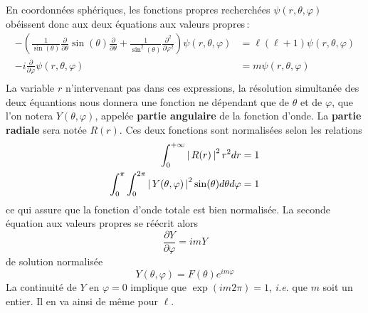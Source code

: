         \begin{demo}
            En coordonnées sphériques, les fonctions propres recherchées $\psi(r,\theta,\varphi)$ obéissent donc aux deux équations aux valeurs propres :
        \begin{align*}
            - \left(\frac{1}{\sin(\theta)}\frac{\partial }{\partial \theta} \sin(\theta) \frac{\partial }{\partial \theta}  + \frac{1}{\sin^2(\theta)}\frac{\partial^2}{\partial \varphi^2} \right) \psi(r,\theta,\varphi) &= \ell(\ell + 1) \psi(r,\theta,\varphi) \\
            -i\frac{\partial }{\partial \varphi} \psi(r,\theta,\varphi) &= m \psi(r, \theta, \varphi) \\
        \end{align*}
        La variable $r$ n’intervenant pas dans ces expressions, la résolution simultanée des deux équantions nous donnera une fonction ne dépendant que de $\theta$ et de $\varphi$, que l’on notera $Y(\theta, \varphi)$, appelée \textbf{partie angulaire} de la fonction d’onde. La \textbf{partie radiale} sera notée $R(r)$. Ces deux fonctions sont normalisées selon les relations
        \begin{align*}
            \int_{0}^{+\infty} \left\lvert \, R(r) \, \right\rvert^2 r^2 dr &= 1 \\
            \int_{0}^{\pi} \int_{0}^{2\pi} \left\lvert \, Y(\theta,\varphi) \, \right\rvert^2 \sin(\theta) d\theta d\varphi &= 1
        \end{align*}
        ce qui assure que la fonction d’onde totale est bien normalisée. La seconde équation aux valeurs propres se réécrit alors 
        \[ \frac{\partial Y}{\partial \varphi} = i m Y \]   
        de solution normalisée 
        \[ Y(\theta, \varphi) = F(\theta) e^{i m \varphi} \]   
        La continuité de $Y$ en $\varphi = 0$ implique que $\exp(im2\pi) = 1$, \textit{i.e.} que $m$ soit un entier. Il en va ainsi de même pour $\ell$.


\end{demo}
